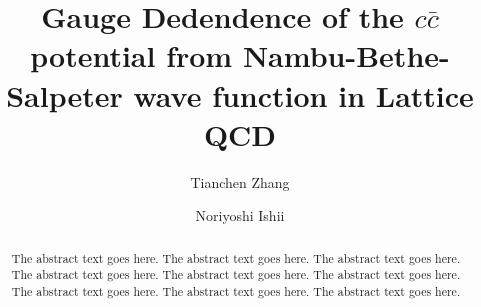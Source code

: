 \documentclass[preprint]{ptephy_v1} \preprintnumber{XXXX-XXXX}
\begin{document}
\title{Gauge Dedendence of the $c\bar{c}$ potential from Nambu-Bethe-Salpeter wave function in Lattice QCD}

\author{Tianchen Zhang} \author{Noriyoshi Ishii}

\begin{abstract}%
    The abstract text goes here. The abstract text goes here. The abstract text goes here.
    The abstract text goes here. The abstract text goes here. The abstract text goes here.
    The abstract text goes here. The abstract text goes here. The abstract text goes here.
\end{abstract}
\maketitle



\let\doi\relax




\end{document}
